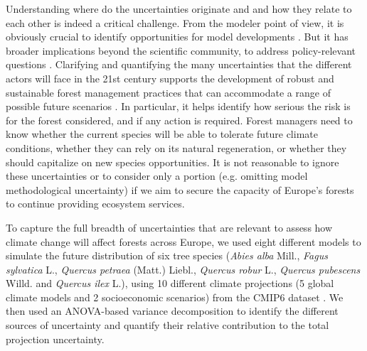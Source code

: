 \documentclass[letterpaper,8pt]{extarticle}  %
\begin{document}
\begin{doublespacing}
\begin{linenumbers}
Understanding where do the uncertainties originate and  and how they relate to each other is indeed a critical challenge. From the modeler point of view, it is obviously crucial to identify opportunities for model developments \citep{Petchey2015}. But it has broader implications beyond the scientific community, to address policy-relevant questions \citep{Urban2016}. Clarifying and quantifying the many uncertainties that the different actors will face in the 21st century supports the development of robust and sustainable forest management practices that can accommodate a range of possible future scenarios \citep{IPCC2021}. In particular, it helps identify how serious the risk is for the forest considered, and if any action is required. Forest managers need to know whether the current species will be able to tolerate future climate conditions, whether they can rely on its natural regeneration, or whether they should capitalize on new species opportunities. It is not reasonable to ignore these uncertainties or to consider only a portion (e.g. omitting model methodological uncertainty) if we aim to secure the capacity of Europe’s forests to continue providing ecosystem services. 


To capture the full breadth of uncertainties that are relevant to assess how climate change will affect forests across Europe,
we used eight different models to simulate the future distribution of six tree species (\emph{Abies alba} Mill., \emph{Fagus sylvatica} L., \emph{Quercus petraea} (Matt.) Liebl., \emph{Quercus robur} L., \emph{Quercus pubescens} Willd. and \emph{Quercus ilex} L.), using 10 different climate projections (5 global climate models and 2 socioeconomic scenarios) from the CMIP6 dataset \citep{Noel2022}. We then used an ANOVA-based variance decomposition to identify the different sources of uncertainty and quantify their relative contribution to the total projection uncertainty.



\end{linenumbers}
\end{doublespacing}
\end{document}
